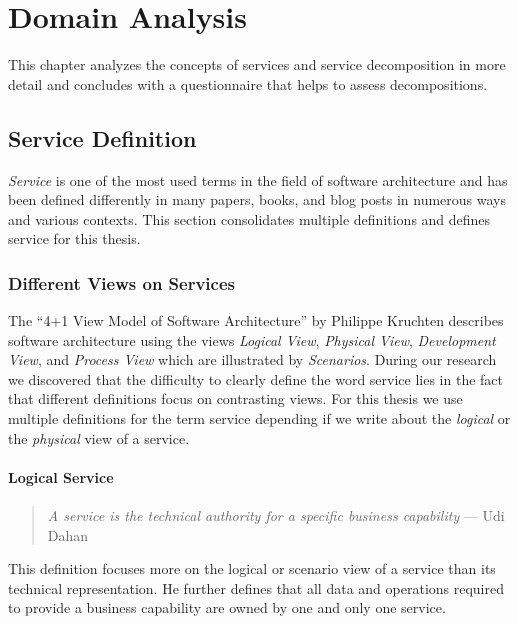 \chapter{Domain Analysis}
\label{cha:analysis}

This chapter analyzes the concepts of services and service decomposition in more detail and concludes with a questionnaire that helps to assess decompositions. 

\section{Service Definition}
\label{sec:serviceIntro}

\textit{Service} is one of the most used terms in the field of software architecture and has been defined differently in many papers, books, and blog posts in numerous ways and various contexts. This section consolidates multiple definitions and defines service for this thesis.

\subsection{Different Views on Services}

The \enquote{4+1 View Model of Software Architecture} by Philippe Kruchten\cite{fourPlusOne} describes software architecture using the views \textit{Logical View}, \textit{Physical View}, \textit{Development View}, and \textit{Process View} which are illustrated by \textit{Scenarios}. During our research we discovered that the difficulty to clearly define the word service lies in the fact that different definitions focus on contrasting views. For this thesis we use multiple definitions for the term service depending if we write about the \textit{logical} or the \textit{physical} view of a service.

\subsubsection{Logical Service}

\begin{quotation}
\textit{A service is the technical authority for a specific business capability} \newline --- Udi Dahan\cite{serviceDefinitionDahan}
\end{quotation}
   
This definition focuses more on the logical or scenario view of a service than its technical representation. He further defines that all data and operations required to provide a business capability are owned by one and only one service. 

